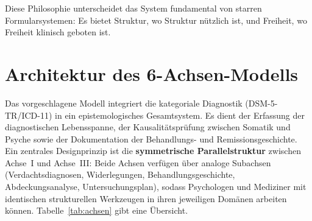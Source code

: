 \documentclass[11pt,a4paper]{article}
\begin{document}
Diese Philosophie unterscheidet das System fundamental von starren Formularsystemen: Es bietet Struktur, wo Struktur n\"utzlich ist, und Freiheit, wo Freiheit klinisch geboten ist.


\section{Architektur des 6-Achsen-Modells}
\label{sec:modell}

Das vorgeschlagene Modell integriert die kategoriale Diagnostik (DSM-5-TR/ICD-11) in ein epistemologisches Gesamtsystem. Es dient der Erfassung der diagnostischen Lebensspanne, der Kausalit\"atspr\"ufung zwischen Somatik und Psyche sowie der Dokumentation der Behandlungs- und Remissionsgeschichte. Ein zentrales Designprinzip ist die \textbf{symmetrische Parallelstruktur} zwischen Achse~I und Achse~III: Beide Achsen verf\"ugen \"uber analoge Subachsen (Verdachtsdiagnosen, Widerlegungen, Behandlungsgeschichte, Abdeckungsanalyse, Untersuchungsplan), sodass Psychologen und Mediziner mit identischen strukturellen Werkzeugen in ihren jeweiligen Dom\"anen arbeiten k\"onnen. Tabelle~\ref{tab:achsen} gibt eine \"Ubersicht.
\end{document}
